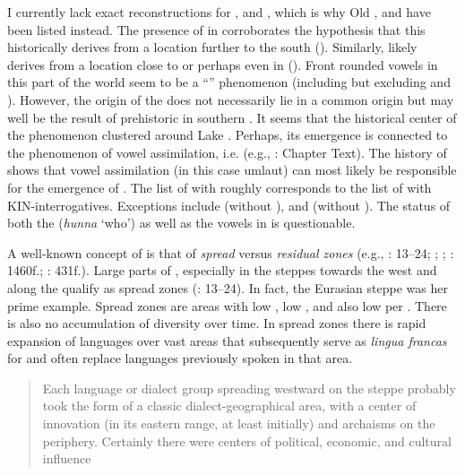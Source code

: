 I currently lack exact reconstructions for ,  and , which is why Old ,  and  have been listed instead. The presence of  in  corroborates the hypothesis that this  historically derives from a location further to the south (). Similarly,  likely derives from a location close to or perhaps even in  (). Front rounded vowels in this part of the world seem to be a “” phenomenon (including  but excluding  and ). However, the origin of the  does not necessarily lie in a common origin but may well be the result of prehistoric  in southern . It seems that the historical center of the phenomenon clustered around Lake . Perhaps, its emergence is connected to the phenomenon of vowel assimilation, i.e.  (e.g., \citealt{Maddieson2013}: Chapter Text). The history of  shows that vowel assimilation (in this case umlaut) can most likely be responsible for the emergence of . The list of  with  roughly corresponds to the list of  with KIN-interrogatives. Exceptions include  (without ), and  (without ). The status of both the  (\textit{hunna} ‘who’) as well as the vowels in  is questionable.

A well-known concept of  is that of \textit{spread} versus \textit{residual zones} (e.g., \citealt{Nichols1992}: 13–24; \citeyear{Nichols1997}; \citeyear{Nichols2015}; \citealt{Dahl2001}: 1460f.; \citealt{Bisang2010}: 431f.). Large parts of , especially in the steppes towards the west and along the  qualify as spread zones (\citealt{Nichols1992}: 13–24). In fact, the Eurasian steppe was her prime example. Spread zones are areas with low , low , and also low  per . There is also no accumulation of diversity over time. In spread zones there is rapid expansion of languages over vast areas that subsequently serve as \textit{lingua francas} for and often replace languages previously spoken in that area.

\begin{quote}
Each language or dialect group spreading westward on the steppe probably took the form of a classic dialect-geographical area, with a center of innovation (in its eastern range, at least initially) and archaisms on the periphery. Certainly there were centers of political, economic, and cultural influence \citep[16]{Nichols1992}
\end{quote}

